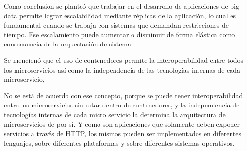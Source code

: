 Como conclusión se planteó que trabajar en el desarrollo de aplicaciones de big data permite lograr escalabilidad mediante réplicas de la aplicación, lo cual es fundamental cuando se trabaja con sistemas que demandan restricciones de tiempo. 
Ese escalamiento puede aumentar o disminuir de forma elástica como consecuencia de la orquestación de sistema. 


Se mencionó que el uso de contenedores permite la interoperabilidad entre todos los microservicios así como la independencia de las tecnologías internas de cada microservicio, 

No se está de acuerdo con ese concepto, porque se puede tener interoperabilidad entre los microservicios sin estar dentro de contenedores, y la independencia de tecnologías internas de cada micro servicio la determina la arquitectura de microservicios de por sí. Y como son aplicaciones que solamente deben exponer servicios a través de HTTP, los mismos pueden ser implementados en diferentes lenguajes, sobre diferentes plataformas y sobre diferentes sistemas operativos.
